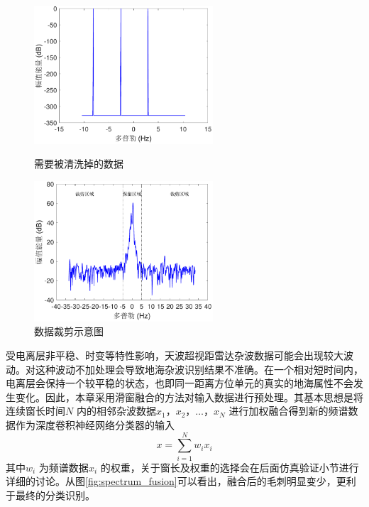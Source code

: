 \begin{figure}[H]
	\centering
	\begin{minipage}{7cm}
		\includegraphics[width=6.67cm]{figures/othr/delete}
		\caption{需要被清洗掉的数据}
		\label{fig:delete}
		
	\end{minipage}
	\hspace{10pt}
	\begin{minipage}{7cm}
		\includegraphics[width=6.67cm]{figures/othr/cut}
		\caption{数据裁剪示意图}
		\label{fig:cut}
		
	\end{minipage}
	
\end{figure}

受电离层非平稳、时变等特性影响，天波超视距雷达杂波数据可能会出现较大波动。对这种波动不加处理会导致地海杂波识别结果不准确。在一个相对短时间内，电离层会保持一个较平稳的状态，也即同一距离方位单元的真实的地海属性不会发生变化。因此，本章采用滑窗融合的方法对输入数据进行预处理。其基本思想是将连续窗长时间$N$ 内的相邻杂波数据$x_1，x_2，\dots，x_N$ 进行加权融合得到新的频谱数据作为深度卷积神经网络分类器的输入
\begin{equation}
	x=\sum_{i=1}^N w_ix_i
	\label{equ:window_fusion}
\end{equation}
其中$w_i$ 为频谱数据$x_i$ 的权重，关于窗长及权重的选择会在后面仿真验证小节进行详细的讨论。从图\ref{fig:spectrum_fusion}可以看出，融合后的毛刺明显变少，更利于最终的分类识别。

